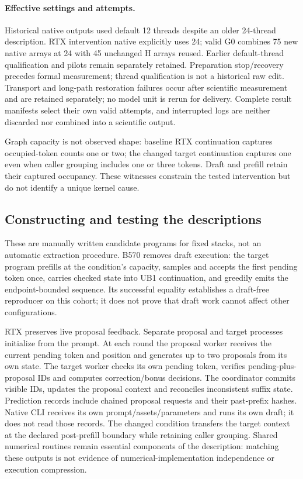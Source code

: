 \paragraph{Effective settings and attempts.}
Historical native outputs used default 12 threads despite an older 24-thread description. RTX intervention native explicitly uses 24; valid G0 combines 75 new native arrays at 24 with 45 unchanged H arrays reused. Earlier default-thread qualification and pilots remain separately retained. Preparation stop/recovery precedes formal measurement; thread qualification is not a historical raw edit. Transport and long-path restoration failures occur after scientific measurement and are retained separately; no model unit is rerun for delivery. Complete result manifests select their own valid attempts, and interrupted logs are neither discarded nor combined into a scientific output.

Graph capacity is not observed shape: baseline RTX continuation captures occupied-token counts one or two; the changed target continuation captures one even when caller grouping includes one or three tokens. Draft and prefill retain their captured occupancy. These witnesses constrain the tested intervention but do not identify a unique kernel cause.

\subsection{Constructing and testing the descriptions}
These are manually written candidate programs for fixed stacks, not an automatic extraction procedure. B570 removes draft execution: the target program prefills at the condition's capacity, samples and accepts the first pending token once, carries checked state into UB1 continuation, and greedily emits the endpoint-bounded sequence. Its successful equality establishes a draft-free reproducer on this cohort; it does not prove that draft work cannot affect other configurations.

RTX preserves live proposal feedback. Separate proposal and target processes initialize from the prompt. At each round the proposal worker receives the current pending token and position and generates up to two proposals from its own state. The target worker checks its own pending token, verifies pending-plus-proposal IDs and computes correction/bonus decisions. The coordinator commits visible IDs, updates the proposal context and reconciles inconsistent suffix state. Prediction records include chained proposal requests and their past-prefix hashes. Native CLI receives its own prompt/assets/parameters and runs its own draft; it does not read those records. The changed condition transfers the target context at the declared post-prefill boundary while retaining caller grouping. Shared numerical routines remain essential components of the description: matching these outputs is not evidence of numerical-implementation independence or execution compression.


